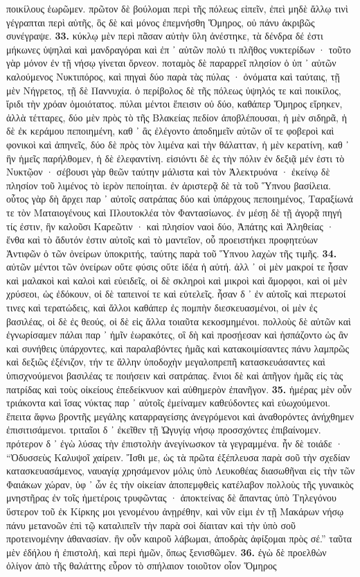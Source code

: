 \documentclass[a4paper, 11pt, oneside, polutonikogreek, german]{article}
\begin{document}
ποικίλους ἑωρῶμεν. πρῶτον δὲ βούλομαι περὶ τῆς πόλεως εἰπεῖν, ἐπεὶ μηδὲ ἄλλῳ τινὶ γέγραπται περὶ αὐτῆς, ὃς δὲ καὶ μόνος ἐπεμνήσθη Ὅμηρος, οὐ πάνυ ἀκριβῶς συνέγραψε. \textbf{33.} κύκλῳ μὲν περὶ πᾶσαν αὐτὴν ὕλη ἀνέστηκε, τὰ δένδρα δέ ἐστι μήκωνες ὑψηλαὶ καὶ μανδραγόραι καὶ ἐπ ᾽ αὐτῶν πολύ τι πλῆθος νυκτερίδων · τοῦτο γὰρ μόνον ἐν τῇ νήσῳ γίνεται ὄρνεον. ποταμὸς δὲ παραρρεῖ πλησίον ὁ ὑπ ᾽ αὐτῶν καλούμενος Νυκτιπόρος, καὶ πηγαὶ δύο παρὰ τὰς πύλας · ὀνόματα καὶ ταύταις, τῇ μὲν Νήγρετος, τῇ δὲ Παννυχία. ὁ περίβολος δὲ τῆς πόλεως ὑψηλός τε καὶ ποικίλος, ἴριδι τὴν χρόαν ὁμοιότατος. πύλαι μέντοι ἔπεισιν οὐ δύο, καθάπερ Ὅμηρος εἴρηκεν, ἀλλὰ τέτταρες, δύο μὲν πρὸς τὸ τῆς Βλακείας πεδίον ἀποβλέπουσαι, ἡ μὲν σιδηρᾶ, ἡ δὲ ἐκ κεράμου πεποιημένη, καθ ᾽ ἃς ἐλέγοντο ἀποδημεῖν αὐτῶν οἵ τε φοβεροὶ καὶ φονικοὶ καὶ ἀπηνεῖς, δύο δὲ πρὸς τὸν λιμένα καὶ τὴν θάλατταν, ἡ μὲν κερατίνη, καθ ᾽ ἣν ἡμεῖς παρήλθομεν, ἡ δὲ ἐλεφαντίνη. εἰσιόντι δὲ ἐς τὴν πόλιν ἐν δεξιᾷ μέν ἐστι τὸ Νυκτῷον · σέβουσι γὰρ θεῶν ταύτην μάλιστα καὶ τὸν Ἀλεκτρυόνα · ἐκείνῳ δὲ πλησίον τοῦ λιμένος τὸ ἱερὸν πεποίηται. ἐν ἀριστερᾷ δὲ τὰ τοῦ Ὕπνου βασίλεια. οὗτος γὰρ δὴ ἄρχει παρ ᾽ αὐτοῖς σατράπας δύο καὶ ὑπάρχους πεποιημένος, Ταραξίωνά τε τὸν Ματαιογένους καὶ Πλουτοκλέα τὸν Φαντασίωνος. ἐν μέσῃ δὲ τῇ ἀγορᾷ πηγή τίς ἐστιν, ἣν καλοῦσι Καρεῶτιν · καὶ πλησίον ναοὶ δύο, Ἀπάτης καὶ Ἀληθείας · ἔνθα καὶ τὸ ἄδυτόν ἐστιν αὐτοῖς καὶ τὸ μαντεῖον, οὗ προειστήκει προφητεύων Ἀντιφῶν ὁ τῶν ὀνείρων ὑποκριτής, ταύτης παρὰ τοῦ Ὕπνου λαχὼν τῆς τιμῆς. \textbf{34.} αὐτῶν μέντοι τῶν ὀνείρων οὔτε φύσις οὔτε ἰδέα ἡ αὐτή. ἀλλ ᾽ οἱ μὲν μακροί τε ἦσαν καὶ μαλακοὶ καὶ καλοὶ καὶ εὐειδεῖς, οἱ δὲ σκληροὶ καὶ μικροὶ καὶ ἄμορφοι, καὶ οἱ μὲν χρύσεοι, ὡς ἐδόκουν, οἱ δὲ ταπεινοί τε καὶ εὐτελεῖς. ἦσαν δ ᾽ ἐν αὐτοῖς καὶ πτερωτοί τινες καὶ τερατώδεις, καὶ ἄλλοι καθάπερ ἐς πομπὴν διεσκευασμένοι, οἱ μὲν ἐς βασιλέας, οἱ δὲ ἐς θεούς, οἱ δὲ εἰς ἄλλα τοιαῦτα κεκοσμημένοι. πολλοὺς δὲ αὐτῶν καὶ ἐγνωρίσαμεν πάλαι παρ ᾽ ἡμῖν ἑωρακότες, οἳ δὴ καὶ προσῄεσαν καὶ ἠσπάζοντο ὡς ἂν καὶ συνήθεις ὑπάρχοντες, καὶ παραλαβόντες ἡμᾶς καὶ κατακοιμίσαντες πάνυ λαμπρῶς καὶ δεξιῶς ἐξένιζον, τήν τε ἄλλην ὑποδοχὴν μεγαλοπρεπῆ κατασκευάσαντες καὶ ὑπισχνούμενοι βασιλέας τε ποιήσειν καὶ σατράπας. ἔνιοι δὲ καὶ ἀπῆγον ἡμᾶς εἰς τὰς πατρίδας καὶ τοὺς οἰκείους ἐπεδείκνυον καὶ αὐθημερὸν ἐπανῆγον. \textbf{35.} ἡμέρας μὲν οὖν τριάκοντα καὶ ἴσας νύκτας παρ ᾽ αὐτοῖς ἐμείναμεν καθεύδοντες καὶ εὐωχούμενοι. ἔπειτα ἄφνω βροντῆς μεγάλης καταρραγείσης ἀνεγρόμενοι καὶ ἀναθορόντες ἀνήχθημεν ἐπισιτισάμενοι. τριταῖοι δ ᾽ ἐκεῖθεν τῇ Ὠγυγίᾳ νήσῳ προσσχόντες ἐπιβαίνομεν. πρότερον δ ᾽ ἐγὼ λύσας τὴν ἐπιστολὴν ἀνεγίνωσκον τὰ γεγραμμένα. ἦν δὲ τοιάδε · "`Ὀδυσσεὺς Καλυψοῖ χαίρειν. Ἴσθι με, ὡς τὰ πρῶτα ἐξέπλευσα παρὰ σοῦ τὴν σχεδίαν κατασκευασάμενος, ναυαγίᾳ χρησάμενον μόλις ὑπὸ Λευκοθέας διασωθῆναι εἰς τὴν τῶν Φαιάκων χώραν, ὑφ ᾽ ὧν ἐς τὴν οἰκείαν ἀποπεμφθεὶς κατέλαβον πολλοὺς τῆς γυναικὸς μνηστῆρας ἐν τοῖς ἡμετέροις τρυφῶντας · ἀποκτείνας δὲ ἅπαντας ὑπὸ Τηλεγόνου ὕστερον τοῦ ἐκ Κίρκης μοι γενομένου ἀνῃρέθην, καὶ νῦν εἰμι ἐν τῇ Μακάρων νήσῳ πάνυ μετανοῶν ἐπὶ τῷ καταλιπεῖν τὴν παρὰ σοὶ δίαιταν καὶ τὴν ὑπὸ σοῦ προτεινομένην ἀθανασίαν. ἢν οὖν καιροῦ λάβωμαι, ἀποδρὰς ἀφίξομαι πρὸς σέ."' ταῦτα μὲν ἐδήλου ἡ ἐπιστολή, καὶ περὶ ἡμῶν, ὅπως ξενισθῶμεν. \textbf{36.} ἐγὼ δὲ προελθὼν ὀλίγον ἀπὸ τῆς θαλάττης εὗρον τὸ σπήλαιον τοιοῦτον οἷον Ὅμηρος 
\end{document}
